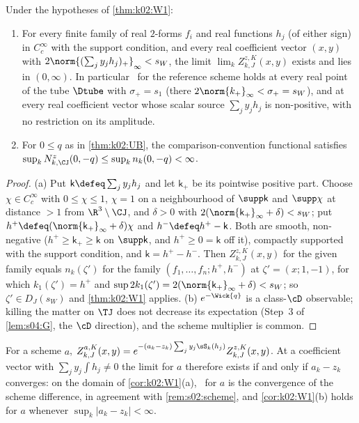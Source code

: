 \begin{corollary}\label{cor:k02:W1}
Under the hypotheses of \cref{thm:k02:W1}:
\begin{enumerate}[label=\textup{(\alph*)},leftmargin=*]
\item For every finite family of real $2$-forms $f_i$ and real functions $h_j$ (of either sign) in $C^\infty_c$ with the support condition, and every real coefficient vector $(x,y)$ with $2\norm{(\sum_jy_jh_j)_+}_\infty<s_W$, the limit $\lim_kZ^{z,K}_{k,J}(x,y)$ exists and lies in $(0,\infty)$. In particular \Wone\ for the reference scheme holds at every real point of the tube $\Dtube$ with $\sigma_+=s_1$ (there $2\norm{k_+}_\infty<\sigma_+=s_W$), and at every real coefficient vector whose scalar source $\sum_jy_jh_j$ is non-positive, with no restriction on its amplitude.
\item For $0\le q$ as in \cref{thm:k02:UB}, the comparison-convention functional satisfies $\sup_kN^z_{k,\CJ}(0,-q)\le\sup_kn_k(0,-q)<\infty$.
\end{enumerate}
\end{corollary}
\begin{proof}
(a) Put $\mathsf k\defeq\sum_jy_jh_j$ and let $\mathsf k_+$ be its pointwise positive part. Choose $\chi\in C^\infty_c$ with $0\le\chi\le1$, $\chi=1$ on a neighbourhood of $\supp\mathsf k$ and $\supp\chi$ at distance $>1$ from $\R^3\setminus\CJ$, and $\delta>0$ with $2(\norm{\mathsf k_+}_\infty+\delta)<s_W$; put $h^+\defeq(\norm{\mathsf k_+}_\infty+\delta)\chi$ and $h^-\defeq h^+-\mathsf k$. Both are smooth, non-negative ($h^+\ge\mathsf k_+\ge\mathsf k$ on $\supp\mathsf k$, and $h^+\ge0=\mathsf k$ off it), compactly supported with the support condition, and $\mathsf k=h^+-h^-$. Then $Z^{z,K}_{k,J}(x,y)$ for the given family equals $n_k(\zeta')$ for the family $(f_1,\dots,f_n;h^+,h^-)$ at $\zeta'=(x;1,-1)$, for which $k_1(\zeta')=h^+$ and $\sup2k_1(\zeta')=2(\norm{\mathsf k_+}_\infty+\delta)<s_W$; so $\zeta'\in D_J(s_W)$ and \cref{thm:k02:W1} applies. (b) $e^{-\Wick{q}}$ is a class-$\cD$ observable; killing the matter on $\TJ$ does not decrease its expectation (Step~3 of \cref{lem:s04:G}, the $\cD$ direction), and the scheme multiplier is common.
\end{proof}

\begin{remark}\label{rem:k02:scheme}
For a scheme $a$, $Z^{a,K}_{k,J}(x,y)=e^{-(a_k-z_k)\sum_jy_j\sS_k(h_j)}Z^{z,K}_{k,J}(x,y)$. At a coefficient vector with $\sum_jy_j\int h_j\ne0$ the limit for $a$ therefore exists if and only if $a_k-z_k$ converges: on the domain of \cref{cor:k02:W1}(a), \Wone\ for $a$ is the convergence of the scheme difference, in agreement with \cref{rem:s02:scheme}, and \cref{cor:k02:W1}(b) holds for $a$ whenever $\sup_k|a_k-z_k|<\infty$.
\end{remark}

